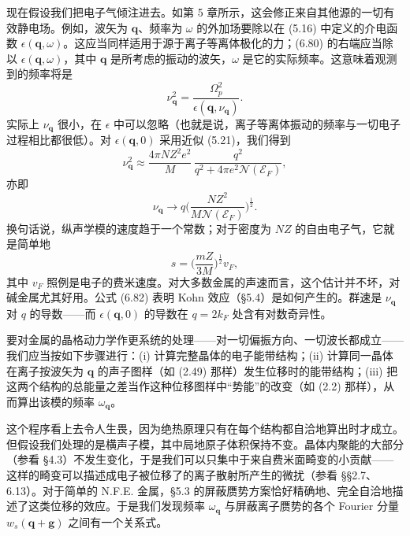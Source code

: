 现在假设我们把电子气倾注进去。如第 5 章所示，这会修正来自其他源的一切有效静电场。例如，波矢为 $\mathbf{q}$、频率为 $\omega$ 的外加场要除以在 (5.16) 中定义的介电函数 $\epsilon(\mathbf{q},\omega)$。这应当同样适用于源于离子等离体极化的力；(6.80) 的右端应当除以 $\epsilon(\mathbf{q},\omega)$，其中 $\mathbf{q}$ 是所考虑的振动的波矢，$\omega$ 是它的实际频率。这意味着观测到的频率将是
\begin{equation*}
\nu_{\mathbf{q}}^{2} = \frac{\Omega_{p}^{2}}{\epsilon(\mathbf{q},\nu_{\mathbf{q}})}. \tag{6.82}
\end{equation*}
实际上 $\nu_{\mathbf{q}}$ 很小，在 $\epsilon$ 中可以忽略（也就是说，离子等离体振动的频率与一切电子过程相比都很低）。对 $\epsilon(\mathbf{q},0)$ 采用近似 (5.21)，我们得到
\begin{equation*}
\nu_{\mathbf{q}}^{2} \approx \frac{4\pi NZ^{2}e^{2}}{M}\,\frac{q^{2}}{q^{2}+4\pi e^{2}\mathcal{N}(\mathcal{E}_{F})}, \tag{6.83}
\end{equation*}
亦即
\begin{equation*}
\nu_{\mathbf{q}} \rightarrow q\biggl(\frac{NZ^{2}}{M\mathcal{N}(\mathcal{E}_{F})}\biggr)^{\frac{1}{2}}. \tag{6.84}
\end{equation*}
换句话说，纵声学模的速度趋于一个常数；对于密度为 $NZ$ 的自由电子气，它就是简单地
\begin{equation*}
s = \biggl(\frac{mZ}{3M}\biggr)^{\frac{1}{2}}v_{F}, \tag{6.85}
\end{equation*}
其中 $v_{F}$ 照例是电子的费米速度。对大多数金属的声速而言，这个估计并不坏，对碱金属尤其好用。公式 (6.82) 表明 Kohn 效应（§5.4）是如何产生的。群速是 $\nu_{\mathbf{q}}$ 对 $q$ 的导数——而 $\epsilon(\mathbf{q},0)$ 的导数在 $q = 2k_{F}$ 处含有对数奇异性。

要对金属的晶格动力学作更系统的处理——对一切偏振方向、一切波长都成立——我们应当按如下步骤进行：(i) 计算完整晶体的电子能带结构；(ii) 计算同一晶体在离子按波矢为 $\mathbf{q}$ 的声子图样（如 (2.49) 那样）发生位移时的能带结构；(iii) 把这两个结构的总能量之差当作这种位移图样中“势能”的改变（如 (2.2) 那样），从而算出该模的频率 $\omega_{\mathbf{q}}$。

这个程序看上去令人生畏，因为绝热原理只有在每个结构都自洽地算出时才成立。但假设我们处理的是横声子模，其中局地原子体积保持不变。晶体内聚能的大部分（参看 §4.3）不发生变化，于是我们可以只集中于来自费米面畸变的小贡献——这样的畸变可以描述成电子被位移了的离子散射所产生的微扰（参看 §§2.7、6.13）。对于简单的 N.F.E. 金属，§5.3 的屏蔽赝势方案恰好精确地、完全自洽地描述了这类位移的效应。于是我们发现频率 $\omega_{\mathbf{q}}$ 与屏蔽离子赝势的各个 Fourier 分量 $w_{s}(\mathbf{q}+\mathbf{g})$ 之间有一个关系式。

